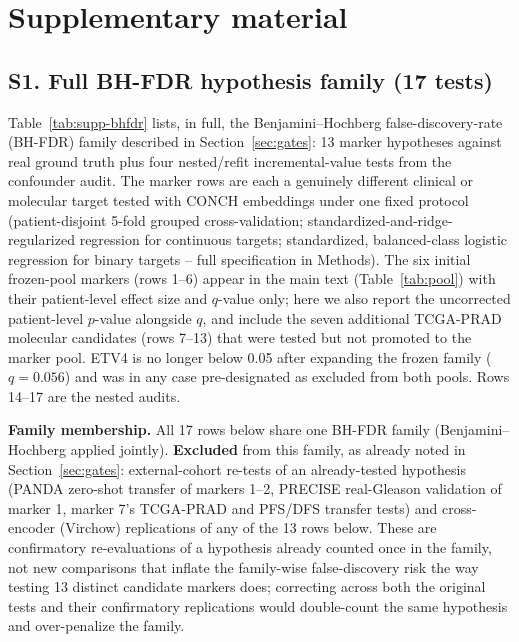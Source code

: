 \section*{Supplementary material}

\subsection*{S1. Full BH-FDR hypothesis family (17 tests)}

Table~\ref{tab:supp-bhfdr} lists, in full, the Benjamini--Hochberg false-discovery-rate (BH-FDR)
family described in Section~\ref{sec:gates}: 13 marker hypotheses against real ground truth
plus four nested/refit incremental-value tests from the confounder audit. The marker rows are
each a genuinely different clinical or molecular
target tested with CONCH embeddings under one fixed protocol (patient-disjoint 5-fold grouped
cross-validation; standardized-and-ridge-regularized regression for continuous targets;
standardized, balanced-class logistic regression for binary targets -- full specification in
Methods). The six initial frozen-pool markers (rows 1--6) appear in the main text
(Table~\ref{tab:pool}) with their patient-level effect size and $q$-value only; here we also
report the uncorrected patient-level $p$-value alongside $q$, and include the seven additional
TCGA-PRAD molecular candidates (rows 7--13) that were tested but not promoted to the marker
pool. ETV4 is no longer below 0.05 after expanding the frozen family ($q=0.056$) and was in any
case pre-designated as excluded from both pools. Rows 14--17 are the nested audits.

\textbf{Family membership.} All 17 rows below share one BH-FDR family (Benjamini--Hochberg
applied jointly). \textbf{Excluded} from this family, as
already noted in Section~\ref{sec:gates}: external-cohort re-tests of an already-tested
hypothesis (PANDA zero-shot transfer of markers 1--2, PRECISE real-Gleason validation of marker
1, marker 7's TCGA-PRAD and PFS/DFS transfer tests) and cross-encoder (Virchow) replications of
any of the 13 rows below. These are confirmatory re-evaluations of a hypothesis already counted
once in the family, not new comparisons that inflate the family-wise false-discovery risk the
way testing 13 distinct candidate markers does; correcting across both the original tests and
their confirmatory replications would double-count the same hypothesis and over-penalize the
family.

